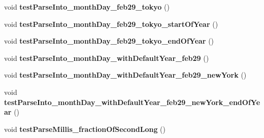 \begin{DoxyCompactItemize}
\item 
\hypertarget{classorg_1_1joda_1_1time_1_1format_1_1_test_date_time_formatter_a3c5ec026aace64498eb742c91886abe6}{void {\bfseries test\-Parse\-Into\-\_\-month\-Day\-\_\-feb29\-\_\-tokyo} ()}\label{classorg_1_1joda_1_1time_1_1format_1_1_test_date_time_formatter_a3c5ec026aace64498eb742c91886abe6}

\item 
\hypertarget{classorg_1_1joda_1_1time_1_1format_1_1_test_date_time_formatter_a0453904476cdeeb44de87f10142938bb}{void {\bfseries test\-Parse\-Into\-\_\-month\-Day\-\_\-feb29\-\_\-tokyo\-\_\-start\-Of\-Year} ()}\label{classorg_1_1joda_1_1time_1_1format_1_1_test_date_time_formatter_a0453904476cdeeb44de87f10142938bb}

\item 
\hypertarget{classorg_1_1joda_1_1time_1_1format_1_1_test_date_time_formatter_a9a1f03700f69956ecc3d25143ed4fe10}{void {\bfseries test\-Parse\-Into\-\_\-month\-Day\-\_\-feb29\-\_\-tokyo\-\_\-end\-Of\-Year} ()}\label{classorg_1_1joda_1_1time_1_1format_1_1_test_date_time_formatter_a9a1f03700f69956ecc3d25143ed4fe10}

\item 
\hypertarget{classorg_1_1joda_1_1time_1_1format_1_1_test_date_time_formatter_a479915d1ccdc89230356c6ea0e916f56}{void {\bfseries test\-Parse\-Into\-\_\-month\-Day\-\_\-with\-Default\-Year\-\_\-feb29} ()}\label{classorg_1_1joda_1_1time_1_1format_1_1_test_date_time_formatter_a479915d1ccdc89230356c6ea0e916f56}

\item 
\hypertarget{classorg_1_1joda_1_1time_1_1format_1_1_test_date_time_formatter_ad801c5f97d22e9e59dccc5f640cfc729}{void {\bfseries test\-Parse\-Into\-\_\-month\-Day\-\_\-with\-Default\-Year\-\_\-feb29\-\_\-new\-York} ()}\label{classorg_1_1joda_1_1time_1_1format_1_1_test_date_time_formatter_ad801c5f97d22e9e59dccc5f640cfc729}

\item 
\hypertarget{classorg_1_1joda_1_1time_1_1format_1_1_test_date_time_formatter_a7d9d27adee486f0ec6feb7596a0ffdc5}{void {\bfseries test\-Parse\-Into\-\_\-month\-Day\-\_\-with\-Default\-Year\-\_\-feb29\-\_\-new\-York\-\_\-end\-Of\-Year} ()}\label{classorg_1_1joda_1_1time_1_1format_1_1_test_date_time_formatter_a7d9d27adee486f0ec6feb7596a0ffdc5}

\item 
\hypertarget{classorg_1_1joda_1_1time_1_1format_1_1_test_date_time_formatter_aa8d9f8b1bd603937de1025392335e648}{void {\bfseries test\-Parse\-Millis\-\_\-fraction\-Of\-Second\-Long} ()}\label{classorg_1_1joda_1_1time_1_1format_1_1_test_date_time_formatter_aa8d9f8b1bd603937de1025392335e648}


\end{DoxyCompactItemize}
